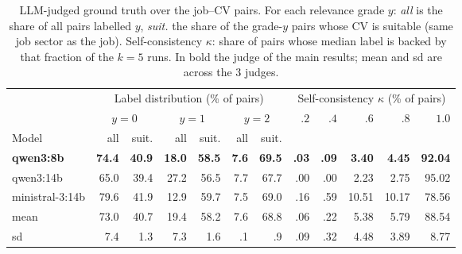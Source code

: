 \begin{table}
\centering\scriptsize
\caption{LLM-judged ground truth over the job--CV pairs. For each relevance grade $y$: \emph{all} is the share of all pairs labelled $y$, \emph{suit.} the share of the grade-$y$ pairs whose CV is suitable (same job sector as the job). Self-consistency $\kappa$: share of pairs whose median label is backed by that fraction of the $k=5$ runs. In bold the judge of the main results; mean and sd are across the 3 judges.}
\label{tab:judge-labels}
\begin{tabular*}{\columnwidth}{@{\extracolsep{\fill}}lrrrrrrrrrrr}
\toprule
& \multicolumn{6}{c}{Label distribution (\% of pairs)} & \multicolumn{5}{c}{Self-consistency $\kappa$ (\% of pairs)} \\
\cmidrule(lr){2-7}\cmidrule(lr){8-12}
& \multicolumn{2}{c}{$y=0$} & \multicolumn{2}{c}{$y=1$} & \multicolumn{2}{c}{$y=2$} & $.2$ & $.4$ & $.6$ & $.8$ & $1.0$ \\
\cmidrule(lr){2-3}\cmidrule(lr){4-5}\cmidrule(lr){6-7}
Model & all & suit. & all & suit. & all & suit. & & & & & \\
\midrule
\textbf{qwen3:8b} & \textbf{74.4} & \textbf{40.9} & \textbf{18.0} & \textbf{58.5} & \textbf{7.6} & \textbf{69.5} & \textbf{.03} & \textbf{.09} & \textbf{3.40} & \textbf{4.45} & \textbf{92.04} \\
qwen3:14b & 65.0 & 39.4 & 27.2 & 56.5 & 7.7 & 67.7 & .00 & .00 & 2.23 & 2.75 & 95.02 \\
ministral-3:14b & 79.6 & 41.9 & 12.9 & 59.7 & 7.5 & 69.0 & .16 & .59 & 10.51 & 10.17 & 78.56 \\
\midrule
mean & 73.0 & 40.7 & 19.4 & 58.2 & 7.6 & 68.8 & .06 & .22 & 5.38 & 5.79 & 88.54 \\
sd & 7.4 & 1.3 & 7.3 & 1.6 & .1 & .9 & .09 & .32 & 4.48 & 3.89 & 8.77 \\
\bottomrule
\end{tabular*}
\end{table}

